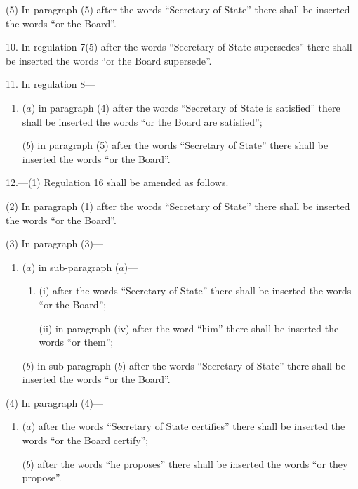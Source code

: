\documentclass[12pt,a4paper]{article}
\begin{document}
(5) In paragraph (5) after the words “Secretary of State” there shall be inserted the words “or the Board”.

\medskip

10.  In regulation 7(5) after the words “Secretary of State supersedes” there shall be inserted the words “or the Board supersede”.

\medskip

11.  In regulation 8—
\begin{enumerate}\item[]
($a$) in paragraph (4) after the words “Secretary of State is satisfied” there shall be inserted the words “or the Board are satisfied”;

($b$) in paragraph (5) after the words “Secretary of State” there shall be inserted the words “or the Board”.
\end{enumerate}

\medskip

12.---(1)  Regulation 16 shall be amended as follows.

(2) In paragraph (1) after the words “Secretary of State” there shall be inserted the words “or the Board”.

(3) In paragraph (3)—
\begin{enumerate}\item[]
($a$) in sub-paragraph ($a$)—
\begin{enumerate}\item[]
(i) after the words “Secretary of State” there shall be inserted the words “or the Board”;

(ii) in paragraph (iv) after the word “him” there shall be inserted the words “or them”;
\end{enumerate}

($b$) in sub-paragraph ($b$)  after the words “Secretary of State” there shall be inserted the words “or the Board”.
\end{enumerate}

(4) In paragraph (4)—
\begin{enumerate}\item[]
($a$) after the words “Secretary of State certifies” there shall be inserted the words “or the Board certify”;

($b$) after the words “he proposes” there shall be inserted the words “or they propose”.
\end{enumerate}

\medskip
\end{document}

